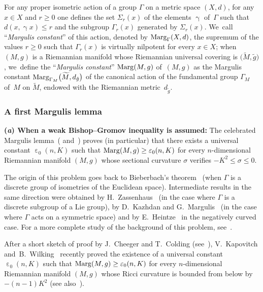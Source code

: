 \documentclass[pdftex]{sigma}
\numberwithin{equation}{section}
\newcommand{\g}{\operatorname{\gamma}}
\newcommand{\e}{\operatorname{\varepsilon}}
\begin{document}
For any proper isometric action of a group $\Gamma$ on a metric space $(X,d)$, for any $x \in X$ and $r \ge 0$ one defines the set
$\Sigma_r (x)$ of the elements $\g$ of~$\Gamma$ such that $d(x, \g x) \le r$ and the subgroup $\Gamma_r (x)$ generated by $\Sigma_r (x)$. We~call ``\emph{Margulis constant}'' of this action, denoted by ${\rm Marg}_\Gamma (X,d)$, the supremum of the values $r \ge 0$ such that $\Gamma_r (x)$
is virtually nilpotent for every $x \in X$; when $(M,g)$ is a Riemannian manifold whose Riemannian universal covering is $\big(\widetilde M, \tilde g\big)$, we~define the
``\emph{Margulis constant}'' ${\rm Marg}(M,g)$ of~$(M,g)$ as the Margulis constant ${\rm Marg}_{\Gamma_M} \big(\widetilde M, d_{\tilde g}\big)$ of the
canonical action of the fundamental group $\Gamma_M$ of~$M$ on $\widetilde M$, endowed with the Riemannian metric~$d_{\tilde g}$.

\subsubsection{A first Margulis lemma}\label{MargLemme}

{\bf (\emph{a}) When a weak Bishop--Gromov inequality is assumed:}
The celebrated Margulis lemma~(\cite{Mar} and~\cite[Section 37.3]{BZ}) proves (in particular) that there exists a universal constant $\e_0 (n, K)$ such that
${\rm Marg}(M,g) \ge \e_0 (n, K)$ for every $n$-dimensional Riemannian manifold $(M,g)$ whose sectional curvature $\sigma$ verifies $-K^2 \le \sigma \le 0$.


The origin of this problem goes back to Bieberbach's theorem~\cite{Bi} (when $\Gamma$ is a discrete group of isometries of the Euclidean space).
Intermediate results in the same direction were obtained by H.~Zassenhaus~\cite{Zass} (in the case where $\Gamma$ is a discrete subgroup of a Lie group),
 by D.~Kazhdan and G.~Margulis~\cite{KM} (in the case where $\Gamma$ acts on a symmetric space) and by E.~Heintze~\cite{zbMATH01825238} in the
negatively curved case. For a more complete study of the background of this problem, see~\cite{Cou}.

{\sloppy
After a short sketch of proof by J.~Cheeger and T.~Colding (see~\cite{CC96}), V.~Kapovitch and~B.~Wilking~\cite{KW} recently proved the existence of
a universal constant $\e_0 (n, K)$ such that \mbox{${\rm Marg}(M,g) \ge \e_0 (n, K)$} for every $n$-dimensional Riemannian manifold $(M,g)$ whose Ricci curvature
is bounded from below by $-(n-1) K^2$ (see also~\cite{Cou}).

}
\end{document}
